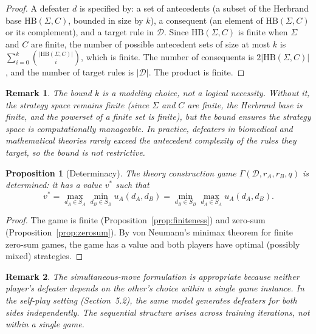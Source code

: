 \documentclass{article}
\newtheorem{proposition}{Proposition}
\newtheorem{remark}{Remark}
\newcommand{\D}{\mathcal{D}}
\begin{document}
\begin{proof}
A defeater $d$ is specified by: a set of antecedents (a subset of the Herbrand base $\mathrm{HB}(\Sigma, C)$, bounded in size by $k$), a consequent (an element of $\mathrm{HB}(\Sigma, C)$ or its complement), and a target rule in $\D$. Since $\mathrm{HB}(\Sigma, C)$ is finite when $\Sigma$ and $C$ are finite, the number of possible antecedent sets of size at most $k$ is $\sum_{i=0}^{k} \binom{|\mathrm{HB}(\Sigma, C)|}{i}$, which is finite. The number of consequents is $2|\mathrm{HB}(\Sigma, C)|$, and the number of target rules is $|\D|$. The product is finite.
\end{proof}
 
\begin{remark}
The bound $k$ is a modeling choice, not a logical necessity. Without it, the strategy space remains finite (since $\Sigma$ and $C$ are finite, the Herbrand base is finite, and the powerset of a finite set is finite), but the bound ensures the strategy space is computationally manageable. In practice, defeaters in biomedical and mathematical theories rarely exceed the antecedent complexity of the rules they target, so the bound is not restrictive.
\end{remark}
 
\begin{proposition}[Determinacy]\label{prop:determinacy}
The theory construction game $\Gamma(\D, r_A, r_B, q)$ is determined: it has a value $v^*$ such that
\[
    v^* = \max_{d_A \in S_A} \min_{d_B \in S_B} u_A(d_A, d_B) = \min_{d_B \in S_B} \max_{d_A \in S_A} u_A(d_A, d_B).
\]
\end{proposition}
 
\begin{proof}
The game is finite (Proposition~\ref{prop:finiteness}) and zero-sum (Proposition~\ref{prop:zerosum}). By von Neumann's minimax theorem for finite zero-sum games, the game has a value and both players have optimal (possibly mixed) strategies.
\end{proof}
 
\begin{remark}
The simultaneous-move formulation is appropriate because neither player's defeater depends on the other's choice within a single game instance. In the self-play setting (Section~5.2), the same model generates defeaters for both sides independently. The sequential structure arises across training iterations, not within a single game.
\end{remark}
 
\end{document}
